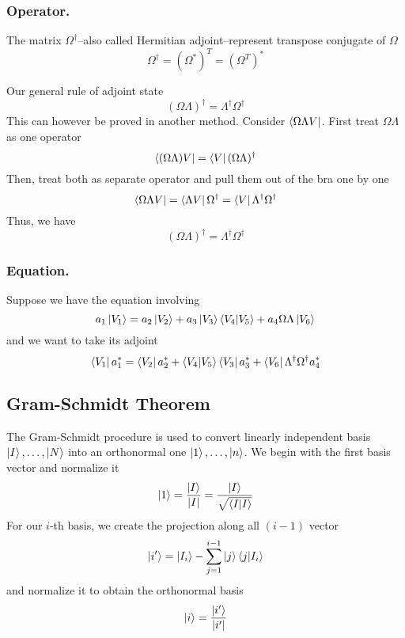 \documentclass[../main.tex]{subfiles}
\begin{document}
\subsubsection{Operator.}
The matrix $\Omega^\dagger$--also called Hermitian adjoint--represent transpose conjugate of $\Omega$
\begin{equation*}
	\Omega^{\dagger}=(\Omega^*)^T=(\Omega^T)^*
\end{equation*}

Our general rule of adjoint state
\begin{equation*}
	(\Omega\Lambda)^\dagger=\Lambda ^\dagger \Omega ^\dagger
\end{equation*}
This can however be proved in another method.
Consider $\bra{\Omega \Lambda V}$. First treat $\Omega\Lambda$ as one operator
\begin{equation*}
	\bra{(\Omega\Lambda)V}=\bra{V}(\Omega\Lambda) ^\dagger
\end{equation*}
Then, treat both as separate operator and pull them out of the bra one by one
\begin{equation*}
	\bra{\Omega\Lambda V}=\bra{\Lambda V}\Omega^\dagger=\bra{V}\Lambda ^\dagger \Omega ^\dagger
\end{equation*}
Thus, we have
\begin{equation*}
	(\Omega\Lambda) ^\dagger=\Lambda ^\dagger\Omega ^\dagger
\end{equation*}

\subsubsection{Equation.}
Suppose we have the equation involving
\begin{equation*}
	a_1 \ket{V_1}=a_2 \ket{V_2}+a_3 \ket{V_3}\braket{V_4|V_5}+a_4\Omega\Lambda \ket{V_6}
\end{equation*}
and we want to take its adjoint
\begin{equation*}
	\bra{V_1}a_1 ^*=\bra{V_2}a_2 ^*+\braket{V_4|V_5}\bra{V_3}a_3 ^*+\bra{V_6}\Lambda ^\dagger\Omega ^\dagger a_4 ^*
\end{equation*}

\subsection{Gram-Schmidt Theorem}
The Gram-Schmidt procedure is used to convert linearly independent basis $\ket{I},\dots,\ket{N}$ into an orthonormal one $\ket{1},\dots,\ket{n}$.
We begin with the first basis vector and normalize it
\begin{equation*}
	\ket{1}=\frac{\ket{I}}{|I|}=\frac{\ket{I}}{\sqrt{\braket{I|I}}}
\end{equation*}
For our $i$-th basis, we create the projection along all $(i-1)$ vector
\begin{equation*}
	\ket{i'}=\ket{I_i}-\sum_{j=1}^{i-1}\ket{j}\braket{j|I_i}
\end{equation*}
and normalize it to obtain the orthonormal basis
\begin{equation*}
	\ket{i}=\frac{\ket{i'}}{|i'|}
\end{equation*}
\end{document}
